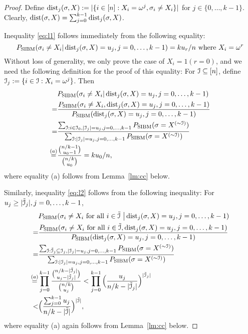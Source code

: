 \documentclass{article}
\begin{document}
\begin{proof}
	Define $\operatorname{dist}_j(\sigma,X):=|\{i\in[n]:X_i=\omega^j, \sigma_i \neq X_i\}|$ for $j \in \{0, \dots, k-1\}$. Clearly, $\operatorname{dist}(\sigma,X)=\sum_{j=0}^{k-1} \operatorname{dist}_j(\sigma,X)$.
	
	Inequality \eqref{eq:l1} follows immediately from the following equality:
	$$
	P_{\operatorname{SIBM}}(\sigma_i \neq X_i |
	\operatorname{dist}_j(\sigma,X)=u_j,
	j=0,\dots,k-1) 
	= k u_r / n \textrm{ where } X_i = \omega^r
	$$
	Without loss of generality,
	we only prove the case of $X_i=1 (r=0)$, and
	we need the following definition for the proof of this equality:
	For $\mathcal{I}\subseteq[n]$, define $\mathcal{I}_j:=\{i\in\mathcal{I}:X_i=\omega^j\}$. Then
	\begin{align*}
	& P_{\operatorname{SIBM}}(\sigma_i \neq X_i |
	\operatorname{dist}_j(\sigma, X) = u_j,j=0,\dots, k-1)  \\
	= & \frac{P_{\operatorname{SIBM}}(\sigma_i \neq X_i ,
		\operatorname{dist}_j(\sigma, X) = u_j,j=0,\dots, k-1)}
	{P_{\operatorname{SIBM}}(
		\operatorname{dist}_j(\sigma, X) = u_j,j=0,\dots, k-1)} \\
	= & \frac{\sum_{\mathcal{I}:i\in\mathcal{I}_0,|\mathcal{I}_j|=u_j,j=0,\dots,k-1}P_{\operatorname{SIBM}}(\sigma=X^{(\sim\mathcal{I})}) }
	{\sum_{\mathcal{I}: |\mathcal{I}_j|=u_j,j=0,\dots,k-1}P_{\operatorname{SIBM}}(\sigma=X^{(\sim\mathcal{I})}) } \\
	\overset{(a)}{=} & \frac{\binom{n/k-1}{u_0 -1}}
	{\binom{n/k}{u_0} }
	= ku_0/n ,
	\end{align*}
	where equality (a) follows from Lemma~\ref{lm:cc} below.
	
	Similarly, inequality \eqref{eq:l2} follows from the following inequality:
	For $u_j\geq |\tilde{\mathcal{I}}_j|, j=0, \dots, k-1$,
	\begin{align*}
	& P_{\operatorname{SIBM}}(\sigma_i \neq X_i \text{~for all~}  i\in\tilde{\mathcal{I}} ~ \big|
	\operatorname{dist}_j(\sigma, X) = u_j,j=0,\dots, k-1)  \\
	= & \frac{P_{\operatorname{SIBM}}(\sigma_i \neq X_i \text{~for all~}  i\in\tilde{\mathcal{I}} ,
		\operatorname{dist}_j(\sigma, X) = u_j,j=0,\dots, k-1)}{P_{\operatorname{SIBM}}(
		\operatorname{dist}_j(\sigma, X) = u_j,j=0,\dots, k-1)} \\
	= & \frac{\sum_{\mathcal{I}:\tilde{\mathcal{I}}_j\subseteq\mathcal{I}_j,
			|\mathcal{I}_j|=u_j,j=0,\dots,k-1}P_{\operatorname{SIBM}}(\sigma=X^{(\sim\mathcal{I})}) }
	{\sum_{\mathcal{I}:|\mathcal{I}_j|=u_j,j=0,\dots,k-1}P_{\operatorname{SIBM}}(\sigma=X^{(\sim\mathcal{I})}) }  \\
	\overset{(a)}{=} & \prod_{j=0}^{k-1} \frac{\binom{n/k-|\tilde{\mathcal{I}}_j|}{u_j -|\tilde{\mathcal{I}}_j|} }
	{\binom{n/k}{u_j} }
	< \prod_{j=0}^{k-1}\Big(\frac{u_j}{n/k- |\tilde{\mathcal{I}}_j|} \Big)^{|\tilde{\mathcal{I}}_j|}
	\\
	< & \Big(\frac{\sum_{j=0}^{k-1} u_j}{n/k- |\tilde{\mathcal{I}}|} \Big)^{|\tilde{\mathcal{I}}|}  ,
	\end{align*}
	where equality (a) again follows from Lemma~\ref{lm:cc} below.
\end{proof}
\end{document}
